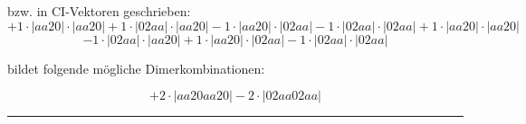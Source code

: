 \documentclass{article}
\begin{document}
\begin{minipage}{\linewidth}
bzw. in CI-Vektoren geschrieben: 
 $$+ 1 \cdot \left|aa20 \right| \cdot \left| aa20 \right| 
+ 1 \cdot \left|02aa \right| \cdot \left| aa20 \right| 
- 1 \cdot \left|aa20 \right| \cdot \left| 02aa \right| 
- 1 \cdot \left|02aa \right| \cdot \left| 02aa \right| 
+ 1 \cdot \left|aa20 \right| \cdot \left| aa20 \right| 
 $$ $$ - 1 \cdot \left|02aa \right| \cdot \left| aa20 \right| 
+ 1 \cdot \left|aa20 \right| \cdot \left| 02aa \right| 
- 1 \cdot \left|02aa \right| \cdot \left| 02aa \right| 
$$



 bildet folgende mögliche Dimerkombinationen:

$$+ 2 \cdot \left|aa20aa20 \right| - 2 \cdot \left|02aa02aa \right| $$



\end{minipage}
\vspace{0.5cm}
\hrule
\vspace{0.5cm}
\end{document}
